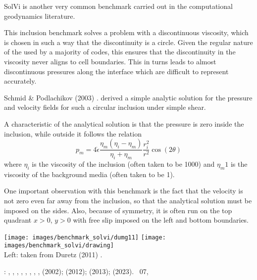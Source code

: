 SolVi is another very common benchmark carried out in the computational 
geodynamics literature.

This inclusion benchmark solves a problem with a discontinuous viscosity, 
which is chosen in such a way that the discontinuity is a circle. 
Given the regular nature of the used by a majority of codes, 
this ensures that the discontinuity in the viscosity never aligns to cell boundaries.
This in turns leads to almost discontinuous pressures along the interface which are difficult 
to represent accurately.

Schmid \& Podlachikov (2003) \cite{scpo03}. 
derived a simple analytic solution for the pressure and velocity fields for such a circular 
inclusion under simple shear.

A characteristic of the analytical solution is that the pressure is zero 
inside the inclusion, while outside it follows the relation
\[
p_m = 4 \dot{\epsilon}
\frac{\eta_m(\eta_i-\eta_m)}{\eta_i+\eta_m}
\frac{r_i^2}{r^2} \cos(2\theta)
\]
where $\eta_i$ is the viscosity of the inclusion (often taken to be 1000)
and $\eta_m1$ is the viscosity of the background media (often taken to be 1). 

One important observation with this benchmark is the fact that the velocity is not zero even far 
away from the inclusion, so that the analytical solution must be imposed on the sides.
Also, because of symmetry, it is often run on the top quadrant $x>0$, $y>0$ with 
free slip imposed on the left and bottom boundaries. 

\begin{center}
\texttt{[image: images/benchmark\_solvi/dumg11]}
\texttt{[image: images/benchmark\_solvi/drawing]}\\
{\captionfont Left: taken from Duretz \etal (2011) \cite{dumg11}. }
\end{center}

\Literature: 
\textcite{kapo06},
\textcite{maie12},
\textcite{deka08},
\textcite{bepo10},
\textcite{sunh10},
\textcite{vosc15},
\textcite{demh19},
\textcite{aspectmanual},
\textcite{litu02} (2002); 
\textcite{krhb12} (2012); 
\textcite{gemd13} (2013);
\textcite{sedu23} (2023).
\stone~07,
